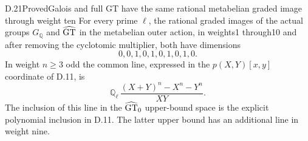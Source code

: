 \begin{statement}{D.21}{Proved}{Galois and full GT have the same rational metabelian graded image through weight ten}
For every prime $\ell$, the rational graded images of the actual groups $G_{\mathbb Q}$ and $\widehat{\rm GT}$ in the metabelian outer action, in weights1 through10 and after removing the cyclotomic multiplier, both have dimensions
\[
                 0,0,1,0,1,0,1,0,1,0.                     \tag{D.21}
\]
In weight $n\geq3$ odd the common line, expressed in the $p(X,Y)[x,y]$ coordinate of D.11, is
\[
 \mathbb Q_\ell\,
 \frac{(X+Y)^n-X^n-Y^n}{XY}.                                \tag{D.22}
\]
The inclusion of this line in the $\widehat{\rm GT}_0$ upper-bound space is the explicit polynomial inclusion in D.11. The latter upper bound has an additional line in weight nine.
\end{statement}
